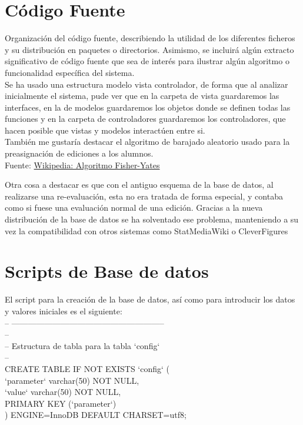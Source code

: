 \section{Código Fuente}
Organización del código fuente, describiendo la utilidad de los diferentes ficheros y su distribución en paquetes o directorios. Asimismo, se incluirá algún extracto significativo de código fuente que sea de interés para ilustrar algún algoritmo o funcionalidad específica del sistema.\\

Se ha usado una estructura modelo vista controlador, de forma que al analizar inicialmente el sistema, pude ver que en la carpeta de vista guardaremos las interfaces, en la de modelos guardaremos los objetos donde se definen todas las funciones y en la carpeta de controladores guardaremos los controladores, que hacen posible que vistas y modelos interactúen entre si.\\

También me gustaría destacar el algoritmo de barajado aleatorio usado para la preasignación de ediciones a los alumnos.\\
Fuente: 
\href{https://es.wikipedia.org/wiki/Algoritmo_Fisher-Yates}{Wikipedia: Algoritmo Fisher-Yates}

Otra cosa a destacar es que con el antiguo esquema de la base de datos, al realizarse una re-evaluación, esta no era tratada de forma especial, y contaba como si fuese una evaluación normal de una edición.
Gracias a la nueva distribución de la base de datos se ha solventado ese problema, manteniendo a su vez la compatibilidad con otros sistemas como StatMediaWiki o CleverFigures

\section{Scripts de Base de datos}
El script para la creación de la base de datos, así como para introducir los datos y valores iniciales es el siguiente:\\

-- --------------------------------------------------------\\

--\\
-- Estructura de tabla para la tabla `config`\\
--\\

CREATE TABLE IF NOT EXISTS `config` (\\
`parameter` varchar(50) NOT NULL,\\
`value` varchar(50) NOT NULL,\\
PRIMARY KEY (`parameter`)\\
) ENGINE=InnoDB DEFAULT CHARSET=utf8;\\

